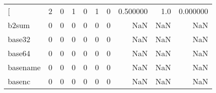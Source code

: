 \begin{longtable}{lrrrrrrrrr}
\bottomrule
\endlastfoot
{[}         &                                                  2 &                                                  0 &                                                  1 &                                                  0 &                                                  1 &                                                  0 &                                           0.500000 &                                    1.0 &                             0.000000 \\
b2sum     &                                                  0 &                                                  0 &                                                  0 &                                                  0 &                                                  0 &                                                  0 &                                                NaN &                                    NaN &                                  NaN \\
base32    &                                                  0 &                                                  0 &                                                  0 &                                                  0 &                                                  0 &                                                  0 &                                                NaN &                                    NaN &                                  NaN \\
base64    &                                                  0 &                                                  0 &                                                  0 &                                                  0 &                                                  0 &                                                  0 &                                                NaN &                                    NaN &                                  NaN \\
basename  &                                                  0 &                                                  0 &                                                  0 &                                                  0 &                                                  0 &                                                  0 &                                                NaN &                                    NaN &                                  NaN \\
basenc    &                                                  0 &                                                  0 &                                                  0 &                                                  0 &                                                  0 &                                                  0 &                                                NaN &                                    NaN &                                  NaN \\

\end{longtable}
